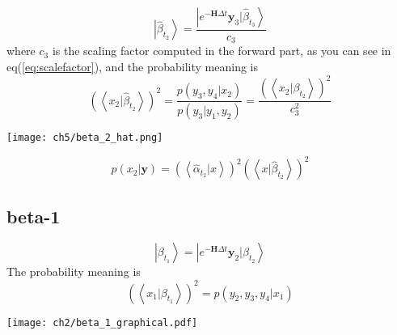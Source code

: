 \begin{definition}
\begin{equation}
        \left|\hat{\beta}_{t_2}  \right> =  \frac{\left| e^{-\textbf{H}\Delta t} \textbf{y}_3 |\hat{\beta}_{t_3} \right>}{c_3}
\end{equation}
where $c_3$ is the scaling factor computed in the forward part, as you can see in eq(\ref{eq:scalefactor}), and 
the probability meaning is
\begin{equation}
        \left(\left<x_2|\hat{\beta}_{t_{2}} \right>\right)^2 = \frac{p(y_3, y_4|x_2)}{p(y_3|y_1,y_2)} 
        =  \frac{ (\left<x_2|\beta_{t_{2}} \right>)^2 }{ c_3^2 }
\end{equation}
\begin{center}
        \texttt{[image: ch5/beta\_2\_hat.png]}
\end{center}
\begin{equation}
        p(x_2|\textbf{y}) = (\left<\hat{\alpha}_{t_{2}}|x \right>)^2 \left(\left<x|\hat{\beta}_{t_{2}} \right>\right)^2
\end{equation} 
\end{definition}

\subsection{beta-1}
\begin{definition}
\begin{equation}
        \left|\beta_{t_1}  \right> =  \left| e^{-\textbf{H}\Delta t} \textbf{y}_2 |\beta_{t_2} \right>
\end{equation}
The probability meaning is
\begin{equation}
           \left( \left<x_1 |\beta_{t_1}  \right> \right)^2 = p(y_2, y_3, y_4 | x_1)
\end{equation}
\begin{center}
        \texttt{[image: ch2/beta\_1\_graphical.pdf]}
\end{center}       
\end{definition}

